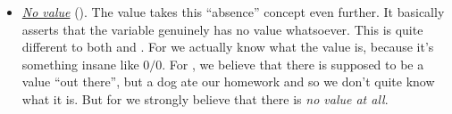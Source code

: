 \begin{itemize}
\item \underline{\it No value} ().
The  value takes this ``absence'' concept even further. It basically asserts that the variable genuinely has no value whatsoever. This is quite different to both  and . For  we actually know what the value is, because it's something insane like $0/0$. For , we believe that there is supposed to be a value ``out there'', but a dog ate our homework and so we don't quite know what it is. But for  we strongly believe that there is {\it no value at all}.  

\end{itemize}




